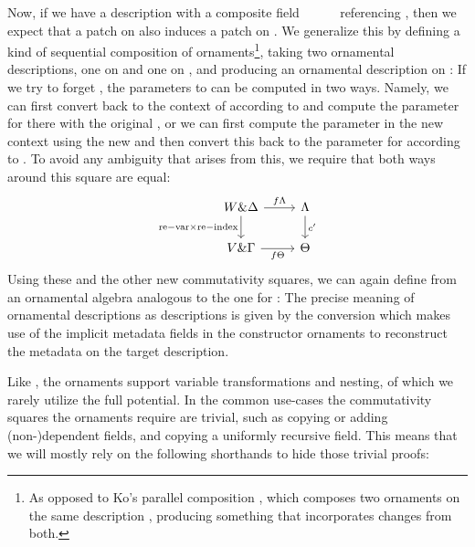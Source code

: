 Now, if we have a description  with a composite field \ \ \ \ \  referencing , then we expect that a patch on  also induces a patch on . We generalize this by defining a kind of sequential composition of ornaments\footnote{As opposed to Ko's parallel composition \cite{kophd}, which composes two ornaments on the same description , producing something that incorporates changes from both.}, taking two ornamental descriptions, one on  and one on , and producing an ornamental description on :
If we try to forget , the parameters to  can be computed in two ways. Namely, we can first convert back to the context of  according to  and compute the parameter for  there with the original , or we can first compute the parameter in the new context using the new  and then convert this back to the parameter for  according to . To avoid any ambiguity that arises from this, we require that both ways around this square are equal:
\[\begin{tikzcd}
	{W \& \Delta} & \Lambda \\
	{V\& \Gamma} & \Theta
	\arrow["{\mathrm{re-var}\times\mathrm{re-index}}"', from=1-1, to=2-1]
	\arrow["f\Lambda", from=1-1, to=1-2]
	\arrow["f\Theta"', from=2-1, to=2-2]
	\arrow["{c'}", from=1-2, to=2-2]
\end{tikzcd}\]
Using these and the other new commutativity squares, we can again define  from an ornamental algebra analogous to the one for :
The precise meaning of ornamental descriptions as descriptions is given by the conversion
which makes use of the implicit metadata fields in the constructor ornaments to reconstruct the metadata on the target description.

Like , the ornaments support variable transformations and nesting, of which we rarely utilize the full potential. In the common use-cases the commutativity squares the ornaments require are trivial, such as copying or adding (non-)dependent fields, and copying a uniformly recursive field. This means that we will mostly rely on the following shorthands to hide those trivial proofs:

